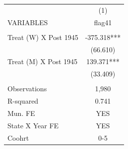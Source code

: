 \begin{tabular}{lc} \hline
 & (1) \\
VARIABLES & flag41 \\ \hline
 &  \\
Treat (W) X Post 1945 & -375.318*** \\
 & (66.610) \\
Treat (M) X Post 1945 & 139.371*** \\
 & (33.409) \\
 &  \\
Observations & 1,980 \\
R-squared & 0.741 \\
Mun. FE & YES \\
State X Year FE & YES \\
 Coohrt & 0-5 \\ \hline
\end{tabular}
